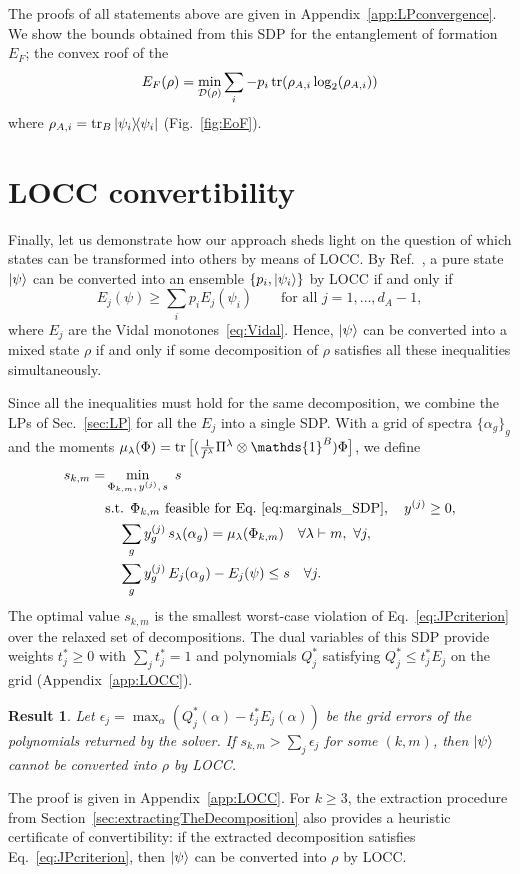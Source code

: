 \documentclass[aps,pra,twocolumn,showpacs,superscriptaddress,groupedaddress]{revtex4-2}
\newcommand{\one}[0]{\mathds{1}}
\renewcommand{\a}{\alpha}
\newcommand{\I}{\one}
\newtheorem{result}    [theorem]{Result}
\begin{document}
The proofs of all statements above are given in Appendix~\ref{app:LPconvergence}. We show the bounds obtained from this SDP for the entanglement of formation $E_F$; the convex roof of the 
\begin{equation}\label{eq:EoF}
    E_F(\rho)=\min_{\mathcal{D}(\rho)}\sum_i - p_i \tr(\rho_{A,i} \log_2(\rho_{A,i}))
\end{equation}
where $\rho_{A,i} = \tr_B\dyad{\psi_i}$ (Fig.~\ref{fig:EoF}).

\section{LOCC convertibility}
Finally, let us demonstrate how our approach sheds light on the question of which states can be transformed into others by means of LOCC.
By Ref.~\cite{Jonathan_1999}, a pure state $\ket{\psi}$ can be converted into an ensemble $\{p_i, \ket{\psi_i}\}$ by LOCC if and only if
\begin{equation}\label{eq:JPcriterion}
    E_j(\psi) \geq \sum_i p_i E_j(\psi_i)\qquad \text{for all } j=1,\dots,d_A-1,
\end{equation}
where $E_j$ are the Vidal monotones~\eqref{eq:Vidal}.
Hence, $\ket{\psi}$ can be converted into a mixed state $\rho$ if and only if some decomposition of $\rho$ satisfies all these inequalities simultaneously.

Since all the inequalities must hold for the same decomposition, we combine the LPs of Sec.~\ref{sec:LP} for all the $E_j$ into a single SDP. With a grid of spectra $\{\a_g\}_g$ and the moments $\mu_\lambda(\Phi)=\tr\big[(\tfrac{1}{f^\lambda}\Pi^\lambda\otimes\I^B)\Phi\big]$, we define
\begin{align}\label{eq:SDPlocc}
    s_{k,m}=&\min_{\Phi_{k,m},\,y^{(j)},\,s}\  s\\
    &\text{s.t. } \Phi_{k,m}\ \text{feasible for Eq.~\eqref{eq:marginals_SDP}},\quad y^{(j)}\geq0, \nonumber\\
    &\quad \sum_g y^{(j)}_g\,s_\lambda(\a_g)=\mu_\lambda(\Phi_{k,m})\quad\forall\lambda\vdash m,\ \forall j, \nonumber\\
    &\quad \sum_g y^{(j)}_g\,E_j(\a_g)-E_j(\psi)\leq s\quad\forall j. \nonumber
\end{align}
The optimal value $s_{k,m}$ is the smallest worst-case violation of Eq.~\eqref{eq:JPcriterion} over the relaxed set of decompositions. The dual variables of this SDP provide weights $t_j^*\geq0$ with $\sum_jt^*_j=1$ and polynomials $Q_j^*$ satisfying $Q^*_j\leq t^*_jE_j$ on the grid (Appendix~\ref{app:LOCC}).
\begin{result}\label{thm:LOCC}
    Let $\epsilon_j=\max_\a\left(Q^*_j(\a)-t^*_jE_j(\a)\right)$ be the grid errors of the polynomials returned by the solver.
    If $s_{k,m}>\sum_j\epsilon_j$ for some $(k,m)$, then $\ket{\psi}$ cannot be converted into $\rho$ by LOCC.
\end{result}
The proof is given in Appendix~\ref{app:LOCC}. For $k\geq 3$, the extraction procedure from Section~\ref{sec:extractingTheDecomposition} also provides a heuristic certificate of convertibility: if the extracted decomposition satisfies Eq.~\eqref{eq:JPcriterion}, then $\ket{\psi}$ can be converted into $\rho$ by LOCC.

\end{document}
